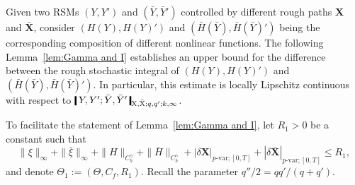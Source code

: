 \documentclass[11pt,reqno]{amsart}
\numberwithin{equation}{section}
\newcommand{\shortthickbar}{%
  \vcenter{\hbox{\rule{1.8pt}{2.2ex}}}%
}
\newcommand{\thicknm}[1]{%
  \mathopen{\shortthickbar}%
  \mkern4mu #1 \mkern4mu%
  \mathclose{\shortthickbar}%
}
\begin{document}
Given two RSMs $(Y, Y')$ and $(\bar Y, \bar Y')$ controlled by different rough paths $\mathbf X$ and $\bar{\mathbf X}$, consider $(H(Y),H(Y)')$ and $(\bar H(\bar Y), \bar H (\bar Y)')$ being the corresponding  composition of different nonlinear functions. The following Lemma~\ref{lem:Gamma and I} establishes an upper bound for the difference between the rough stochastic integral of $(H(Y),H(Y)')$ and $(\bar H(\bar Y), \bar H (\bar Y)')$. In particular, this estimate is locally Lipschitz continuous with respect to $\thicknm{Y, Y' ;\bar Y, \bar Y'}_{\mathrm X, \bar{\mathrm X};q,q';k,\infty}$. 

To facilitate the statement of Lemma~\ref{lem:Gamma and I}, let $R_1 > 0$ be a constant such that 
\begin{equation*}
\|\xi\|_{\infty} + \|\bar \xi\|_{\infty} + \|H\|_{C^{\gamma}_b} + \|\bar H\|_{C^{\gamma}_b} + |\delta \mathbf X |_{p\text{-}\mathrm{var};[0,T]} + |\delta \bar{\mathbf X} |_{p\text{-}\mathrm{var};[0,T]} \le R_1, 
\end{equation*}
and denote $\Theta_{1} := (\Theta,C_{f},R_1)$. Recall the parameter $q''/2 = qq'/(q+q')$.
\end{document}

